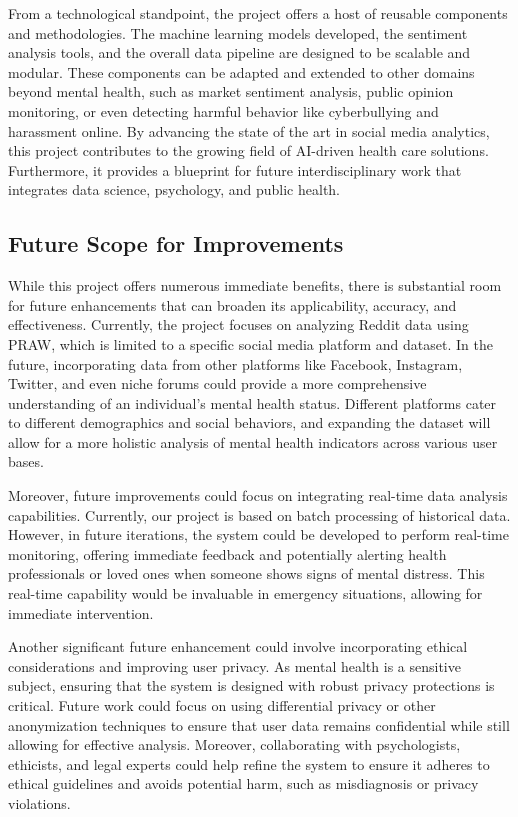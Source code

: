 \vspace{1em}
\noindent
From a technological standpoint, the project offers a host of reusable components and methodologies. The machine learning models developed, the sentiment analysis tools, and the overall data pipeline are designed to be scalable and modular. These components can be adapted and extended to other domains beyond mental health, such as market sentiment analysis, public opinion monitoring, or even detecting harmful behavior like cyberbullying and harassment online. By advancing the state of the art in social media analytics, this project contributes to the growing field of AI-driven health care solutions. Furthermore, it provides a blueprint for future interdisciplinary work that integrates data science, psychology, and public health. 

\subsection{Future Scope for Improvements}
\noindent
While this project offers numerous immediate benefits, there is substantial room for future enhancements that can broaden its applicability, accuracy, and effectiveness. Currently, the project focuses on analyzing Reddit data using PRAW, which is limited to a specific social media platform and dataset. In the future, incorporating data from other platforms like Facebook, Instagram, Twitter, and even niche forums could provide a more comprehensive understanding of an individual’s mental health status. Different platforms cater to different demographics and social behaviors, and expanding the dataset will allow for a more holistic analysis of mental health indicators across various user bases.

\vspace{1em}
\noindent
Moreover, future improvements could focus on integrating real-time data analysis capabilities. Currently, our project is based on batch processing of historical data. However, in future iterations, the system could be developed to perform real-time monitoring, offering immediate feedback and potentially alerting health professionals or loved ones when someone shows signs of mental distress. This real-time capability would be invaluable in emergency situations, allowing for immediate intervention.

\vspace{1em}
\noindent
Another significant future enhancement could involve incorporating ethical considerations and improving user privacy. As mental health is a sensitive subject, ensuring that the system is designed with robust privacy protections is critical. Future work could focus on using differential privacy or other anonymization techniques to ensure that user data remains confidential while still allowing for effective analysis. Moreover, collaborating with psychologists, ethicists, and legal experts could help refine the system to ensure it adheres to ethical guidelines and avoids potential harm, such as misdiagnosis or privacy violations.

